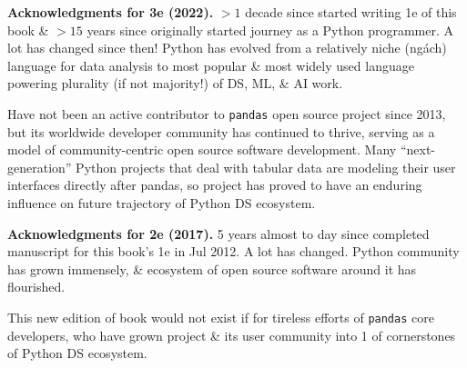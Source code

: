 \documentclass{article}
\begin{document}
{\bf Acknowledgments for 3e (2022).} $> 1$ decade since started writing 1e of this book \& $> 15$ years since originally started journey as a Python programmer. A lot has changed since then! Python has evolved from a relatively niche (ngách) language for data analysis to most popular \& most widely used language powering plurality (if not majority!) of DS, ML, \& AI work.

Have not been an active contributor to {\tt pandas} open source project since 2013, but its worldwide developer community has continued to thrive, serving as a model of community-centric open source software development. Many ``next-generation'' Python projects that deal with tabular data are modeling their user interfaces directly after pandas, so project has proved to have an enduring influence on future trajectory of Python DS ecosystem.

{\bf Acknowledgments for 2e (2017).} 5 years almost to day since completed manuscript for this book's 1e in Jul 2012. A lot has changed. Python community has grown immensely, \& ecosystem of open source software around it has flourished.

This new edition of book would not exist if for tireless efforts of {\tt pandas} core developers, who have grown project \& its user community into 1 of cornerstones of Python DS ecosystem.
\end{document}
